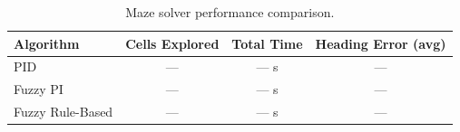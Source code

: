 \begin{table}[htbp]
\centering
\caption{Maze solver performance comparison.}
\label{tab:ms-performance}
\begin{tabular}{l c c c}
\hline
\textbf{Algorithm} & \textbf{Cells Explored} & \textbf{Total Time} & \textbf{Heading Error (avg)} \\
\hline
PID             & --- & --- s & ---\textdegree{} \\
Fuzzy PI        & --- & --- s & ---\textdegree{} \\
Fuzzy Rule-Based & --- & --- s & ---\textdegree{} \\
\hline
\end{tabular}
\end{table}
